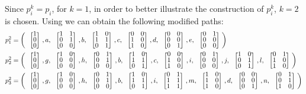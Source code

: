 Since $p_i^k=p_i$, for $k=1$, in order to better illustrate the
construction of $p_i^k$, $k=2$ is chosen. Using  we can
obtain the following modified paths: 
\begin{align*}
  p_1^2&= \left(\colvec{1\\0\\0},a,\colvec{1&1\\0&1\\0&0},b,\colvec{1&0\\1&1\\0&1},c,\colvec{0&0\\1&0\\1&0},d,\colvec{0&0\\0&0\\0&1},e,\colvec{0&1\\0&0\\0&0}\right) \\
  p_2^2&= \left(\colvec{1\\0\\0},g,\colvec{1&0\\0&0\\0&0},h,\colvec{0&1\\0&1\\0&0},b,\colvec{1&0\\1&1\\0&1},c,\colvec{0&0\\1&0\\1&0},i,\colvec{0&1\\0&0\\0&0},j,\colvec{1&0\\0&1\\0&1},l,\colvec{0&1\\1&0\\1&0}\right) \\
  p_3^2&= \left(\colvec{1\\0\\0},g,\colvec{1&0\\0&0\\0&0},h,\colvec{0&1\\0&1\\0&0},b,\colvec{1&0\\1&1\\0&1},i,\colvec{0&1\\1&1\\1&1},m,\colvec{1&0\\1&0\\1&0},d,\colvec{0&0\\0&0\\0&1},n,\colvec{0&1\\0&1\\1&0}\right) \\
\end{align*}

